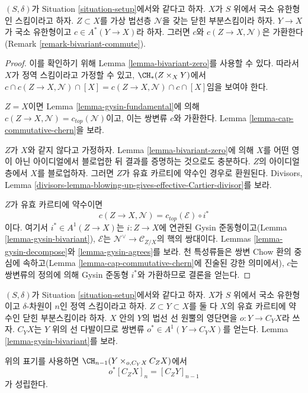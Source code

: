 \begin{lemma}
\label{lemma-gysin-commutes}
$(S, \delta)$가 Situation \ref{situation-setup}에서와 같다고 하자.
$X$가 $S$ 위에서 국소 유한형인 스킴이라고 하자. $Z \subset X$를
가상 법선층 $\mathcal{N}$을 갖는 닫힌 부분스킴이라 하자.
$Y \to X$가 국소 유한형이고 $c \in A^*(Y \to X)$라 하자. 그러면
$c$와 $c(Z \to X, \mathcal{N})$은 가환한다(Remark
\ref{remark-bivariant-commute}).
\end{lemma}

\begin{proof}
이를 확인하기 위해 Lemma \ref{lemma-bivariant-zero}를 사용할 수 있다.
따라서 $X$가 정역 스킴이라고 가정할 수 있고,
$\CH_*(Z \times_X Y)$에서
$c \cap c(Z \to X, \mathcal{N}) \cap [X] =
c(Z \to X, \mathcal{N}) \cap c \cap [X]$임을 보여야 한다.

\medskip\noindent
$Z = X$이면 Lemma \ref{lemma-gysin-fundamental}에 의해
$c(Z \to X, \mathcal{N}) = c_{top}(\mathcal{N})$이고, 이는 쌍변류
$c$와 가환한다. Lemma \ref{lemma-cap-commutative-chern}을 보라.

\medskip\noindent
$Z$가 $X$와 같지 않다고 가정하자. Lemma
\ref{lemma-bivariant-zero}에 의해 $X$를 어떤 영이 아닌 아이디얼에서
블로업한 뒤 결과를 증명하는 것으로도 충분하다. $Z$의 아이디얼 층에서
$X$를 블로업하자. 그러면 $Z$가 유효 카르티에 약수인 경우로 환원된다.
Divisors, Lemma
\ref{divisors-lemma-blowing-up-gives-effective-Cartier-divisor}를 보라.

\medskip\noindent
$Z$가 유효 카르티에 약수이면
$$
c(Z \to X, \mathcal{N}) =
c_{top}(\mathcal{E}) \circ i^*
$$
이다. 여기서 $i^* \in A^1(Z \to X)$는 $i : Z \to X$에 연관된
Gysin 준동형이고(Lemma \ref{lemma-gysin-bivariant}),
$\mathcal{E}$는 $\mathcal{N}^\vee \to \mathcal{C}_{Z/X}$의 핵의
쌍대이다. Lemmas \ref{lemma-gysin-decompose}와
\ref{lemma-gysin-agrees}를 보라. 천 특성류들은 쌍변 Chow 환의 중심에
속하고(Lemma \ref{lemma-cap-commutative-chern}에 진술된 강한 의미에서),
$c$는 쌍변류의 정의에 의해 Gysin 준동형 $i^*$와 가환하므로 결론을
얻는다.
\end{proof}

\noindent
$(S, \delta)$가 Situation \ref{situation-setup}에서와 같다고 하자.
$X$가 $S$ 위에서 국소 유한형이고 $\delta$-차원이 $n$인 정역
스킴이라고 하자. $Z \subset Y \subset X$를 둘 다 $X$의 유효
카르티에 약수인 닫힌 부분스킴이라 하자. $X$ 안의 $Y$의 법선 선
원뿔의 영단면을 $o : Y \to C_Y X$라 쓰자. $C_YX$는 $Y$ 위의 선
다발이므로 쌍변류 $o^* \in A^1(Y \to C_YX)$를 얻는다. Lemma
\ref{lemma-gysin-bivariant}를 보라.

\begin{lemma}
\label{lemma-relation-normal-cones}
위의 표기를 사용하면 $\CH_{n - 1}(Y \times_{o, C_Y X} C_ZX)$에서
$$
o^*[C_ZX]_n = [C_Z Y]_{n - 1}
$$
가 성립한다.
\end{lemma}

